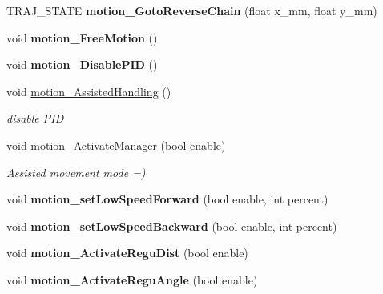\begin{DoxyCompactItemize}
T\+R\+A\+J\+\_\+\+S\+T\+A\+TE {\bfseries motion\+\_\+\+Goto\+Reverse\+Chain} (float x\+\_\+mm, float y\+\_\+mm)
\item 
\mbox{\label{classAsservDriver_aac603258c40d4c9aede0e5fce6ed4dea}} 
void {\bfseries motion\+\_\+\+Free\+Motion} ()
\item 
\mbox{\label{classAsservDriver_a0a68a702d1fea277c2e24e6dceb2d646}} 
void {\bfseries motion\+\_\+\+Disable\+P\+ID} ()
\item 
\mbox{\label{classAsservDriver_a733d0cddfdb612cea9e8097b348537f1}} 
void \hyperlink{classAsservDriver_a733d0cddfdb612cea9e8097b348537f1}{motion\+\_\+\+Assisted\+Handling} ()
\begin{DoxyCompactList}\small\item\em disable P\+ID \end{DoxyCompactList}\item 
\mbox{\label{classAsservDriver_aaeb3c80c8a079c812af38273f825c537}} 
void \hyperlink{classAsservDriver_aaeb3c80c8a079c812af38273f825c537}{motion\+\_\+\+Activate\+Manager} (bool enable)
\begin{DoxyCompactList}\small\item\em Assisted movement mode =) \end{DoxyCompactList}\item 
\mbox{\label{classAsservDriver_a17a6651fc8ecebafc085c46af984b099}} 
void {\bfseries motion\+\_\+set\+Low\+Speed\+Forward} (bool enable, int percent)
\item 
\mbox{\label{classAsservDriver_ac01272d7ef32443b3c283186041324c3}} 
void {\bfseries motion\+\_\+set\+Low\+Speed\+Backward} (bool enable, int percent)
\item 
\mbox{\label{classAsservDriver_a48e4f69bf857d6a18098dc48615a61f1}} 
void {\bfseries motion\+\_\+\+Activate\+Regu\+Dist} (bool enable)
\item 
\mbox{\label{classAsservDriver_a846608b8033f7d592d2540b68de72eeb}} 
void {\bfseries motion\+\_\+\+Activate\+Regu\+Angle} (bool enable)
\item 

\end{DoxyCompactItemize}
